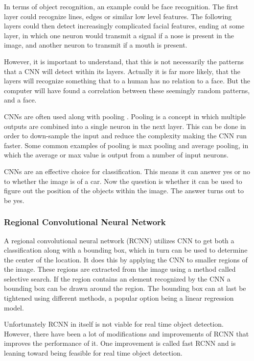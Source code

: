 In terms of object recognition, an example could be face recognition.
The first layer could recognize lines, edges or similar low level features.
The following layers could then detect increasingly complicated facial features, ending at some layer, in which one neuron would transmit a signal if a nose is present in the image, and another neuron to transmit if a mouth is present.



However, it is important to understand, that this is not necessarily the patterns that a CNN will detect within its layers.
Actually it is far more likely, that the layers will recognize something that to a human has no relation to a face.
But the computer will have found a correlation between these seemingly random patterns, and a face.

CNNs are often used along with pooling \cite{CNN}.
Pooling is a concept in which multiple outputs are combined into a single neuron in the next layer.
This can be done in order to down-sample the input and reduce the complexity making the CNN run faster.
Some common examples of pooling is max pooling and average pooling, in which the average or max value is output from a number of input neurons.

CNNs are an effective choice for classification. 
This means it can answer yes or no to whether the image is of a car.
Now the question is whether it can be used to figure out the position of the objects within the image.
The answer turns out to be yes.


\subsubsection{Regional Convolutional Neural Network}

A regional convolutional neural network (RCNN) utilizes CNN to get both a classification along with a bounding box, which in turn can be used to determine the center of the location.
It does this by applying the CNN to smaller regions of the image. 
These regions are extracted from the image using a method called selective search.
If the region contains an element recognized by the CNN a bounding box can be drawn around the region.
The bounding box can at last be tightened using different methods, a popular option being a linear regression model.\cite{CNNHistory}

Unfortunately RCNN in itself is not viable for real time object detection.
However, there have been a lot of modifications and improvements of RCNN that improves the performance of it.
One improvement is called fast RCNN and is leaning toward being feasible for real time object detection.

